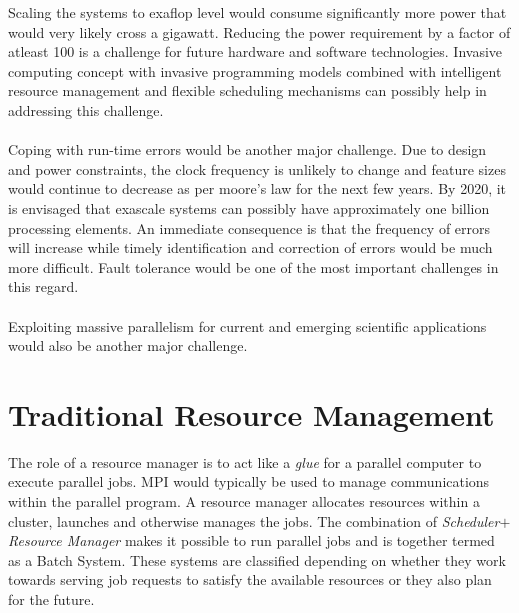 Scaling the systems to exaflop level would consume significantly more power that would very likely cross a gigawatt. Reducing the power requirement by a factor of atleast 100 is a challenge for future hardware and software technologies. Invasive computing concept with invasive programming models combined with intelligent resource management and flexible scheduling mechanisms can possibly help in addressing this challenge.\\ \\
Coping with run-time errors would be another major challenge. Due to design and power constraints, the clock frequency is unlikely to change and feature sizes would continue to decrease as per moore's law for the next few years. By 2020, it is envisaged that exascale systems can possibly have approximately one billion processing elements. An immediate consequence is that the frequency of errors will increase while timely identification and correction of errors would be much more difficult. Fault tolerance would be one of the most important challenges in this regard.\\ \\
Exploiting massive parallelism for current and emerging scientific applications would also be another major challenge.
\section{Traditional Resource Management}
The role of a resource manager is to act like a \textit{glue} for a parallel computer to execute parallel jobs. MPI would typically be used to manage communications within the parallel program. A resource manager allocates resources within a cluster, launches and otherwise manages the jobs. The combination of \textit{Scheduler}$+$\textit{Resource Manager} makes it possible to run parallel jobs and is together termed as a Batch System. These systems are classified\cite{streit} depending on whether they work towards serving job requests to satisfy the available resources or they also plan for the future.
